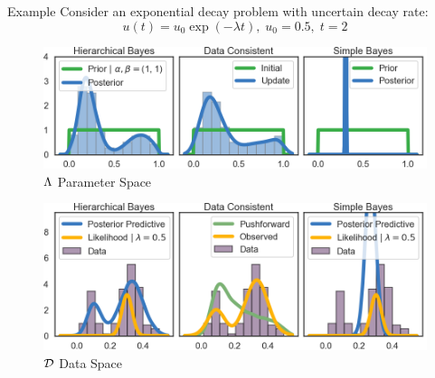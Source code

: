 \begin{block}{Example}
\centering
Consider an exponential decay problem with uncertain decay rate:
\begin{equation*}
       u(t) = u_0\exp(-\lambda t), \; u_0 = 0.5 ,\; t=2
   \end{equation*}

\begin{tabular}{c|c}
\toprule
{} & 
$\prior \sim U[0,1]\; , \quad  \likelihood\qGivelam\sim N\left(Q\lam,\sigma^2\right) $ \\
                                        & $\bayes$ \\ 
\midrule
\multirow{3}{*}{\textbf{Hierarchical Bayes}{}   &
        $\prior\hyper \sim \chi^2_1\; , \quad \alpha,\beta\in\Omega :=[0,\infty)\times[0,\infty)$ \\
        & $\prior\lamGiveH s\sim \text{Beta}\hyper, \quad \likelihood\qGivelam \sim N\left(Q\lam,\sigma^2\right)$ \\
        & $\Hbayes$ \\
\midrule
\textbf{Data Consistent} &  $\dci$\\
\bottomrule
\end{tabular}
\vspace{1cm}
\begin{figure}
        \includegraphics[width=32cm]{figures/distr_EX_lambda_space.png}
        \vspace{-0.5cm}
        \centering
        \caption{\large $\Lambda$ Parameter Space }
\end{figure}
\vspace{-0.5cm}
\begin{figure}
        \includegraphics[width=32cm]{figures/distr_EX_data_space.png}
        \vspace{-0.5cm}
        \centering
        \caption{\large $\mathcal{D}$ Data Space  }
\end{figure}



\end{block}
